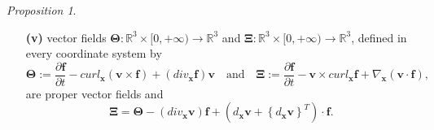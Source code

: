 \documentclass{article}
\newtheorem{proposition}{Proposition}[section]
\theoremstyle{definition}
\theoremstyle{remark}
\renewcommand{\vec}[1]{\mathbf{#1}}
\newcommand{\R}{\mathbb{R}}
\newcommand{\R}{{\mathbb{R}}}
\newtheorem{proposition}{Proposition}
\begin{document}
\begin{proposition}
\begin{itemize}
\item[{\bf(v)}] vector fields $\vec\Theta:\R^3\times[0,+\infty)\to\R^3$ and $\vec\Xi:\R^3\times[0,+\infty)\to\R^3$, defined
in every coordinate system by
\begin{equation}\label{vfyutuyfffhhgfhgfh}
\vec\Theta:=\frac{\partial \vec f}{\partial t}- curl_{\vec
x}\left(\vec v\times \vec f\right)+\left({div}_{\vec x}\vec
f\right)\vec v\quad\text{and}\quad \vec\Xi:=\frac{\partial \vec
f}{\partial t}- \vec v\times curl_{\vec x}\vec f+\nabla_{\vec
x}\left(\vec v\cdot\vec f\right),
\end{equation}
are proper vector fields and
\begin{equation}
\label{vhfffngghhjghhgjlkhjhkPPP} \vec\Xi
=
\vec\Theta-\left(div_{\vec x}\vec v\right)\vec f+ \left(d_{\vec
x}\vec v+\left\{d_{\vec x}\vec v\right\}^T\right)\cdot\vec f.
\end{equation}
\end{itemize}
\end{proposition}
\end{document}
